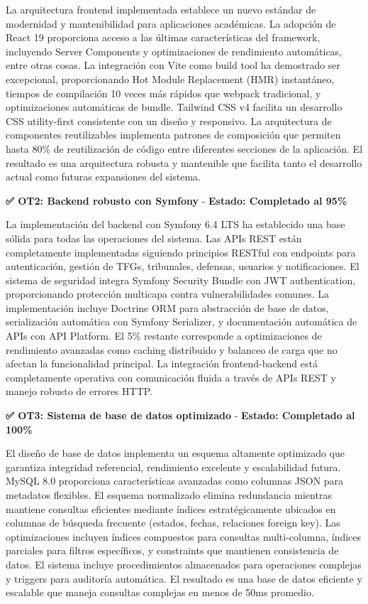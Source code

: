 \documentclass[12pt,a4paper,oneside]{report}
\begin{document}
La arquitectura frontend implementada establece un nuevo estándar de modernidad y mantenibilidad para aplicaciones académicas. La adopción de React 19 proporciona acceso a las últimas características del framework, incluyendo Server Components y optimizaciones de rendimiento automáticas, entre otras cosas. La integración con Vite como build tool ha demostrado ser excepcional, proporcionando Hot Module Replacement (HMR) instantáneo, tiempos de compilación 10 veces más rápidos que webpack tradicional, y optimizaciones automáticas de bundle. Tailwind CSS v4 facilita un desarrollo CSS utility-first consistente con un diseño y responsivo. La arquitectura de componentes reutilizables implementa patrones de composición que permiten hasta 80\% de reutilización de código entre diferentes secciones de la aplicación. El resultado es una arquitectura robusta y mantenible que facilita tanto el desarrollo actual como futuras expansiones del sistema.

\textbf{✅ OT2: Backend robusto con Symfony} - \textbf{Estado: Completado al 95\%}

La implementación del backend con Symfony 6.4 LTS ha establecido una base sólida para todas las operaciones del sistema. Las APIs REST están completamente implementadas siguiendo principios RESTful con endpoints para autenticación, gestión de TFGs, tribunales, defensas, usuarios y notificaciones. El sistema de seguridad integra Symfony Security Bundle con JWT authentication, proporcionando protección multicapa contra vulnerabilidades comunes. La implementación incluye Doctrine ORM para abstracción de base de datos, serialización automática con Symfony Serializer, y documentación automática de APIs con API Platform. El 5\% restante corresponde a optimizaciones de rendimiento avanzadas como caching distribuido y balanceo de carga que no afectan la funcionalidad principal. La integración frontend-backend está completamente operativa con comunicación fluida a través de APIs REST y manejo robusto de errores HTTP.

\textbf{✅ OT3: Sistema de base de datos optimizado} - \textbf{Estado: Completado al 100\%}

El diseño de base de datos implementa un esquema altamente optimizado que garantiza integridad referencial, rendimiento excelente y escalabilidad futura. MySQL 8.0 proporciona características avanzadas como columnas JSON para metadatos flexibles. El esquema normalizado elimina redundancia mientras mantiene consultas eficientes mediante índices estratégicamente ubicados en columnas de búsqueda frecuente (estados, fechas, relaciones foreign key). Las optimizaciones incluyen índices compuestos para consultas multi-columna, índices parciales para filtros específicos, y constraints que mantienen consistencia de datos. El sistema incluye procedimientos almacenados para operaciones complejas y triggers para auditoría automática. El resultado es una base de datos eficiente y escalable que maneja consultas complejas en menos de 50ms promedio.
\end{document}

